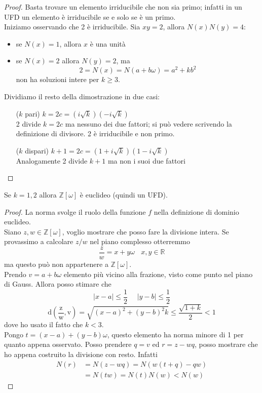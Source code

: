 \begin{proof}
	Basta trovare un elemento irriducibile che non sia primo; infatti in un UFD un elemento è irriducibile se e solo se è un primo. \\
	Iniziamo osservando che 2 è irriducibile. Sia $xy=2$, allora $N(x)N(y)=4$: 
	\begin{itemize}
		\item se $N(x)=1$, allora $x$ è una unità
		\item se $N(x)=2$ allora $N(y)=2$, ma 
		\begin{equation*}
		2=N(x)=N(a+b\omega)=a^2+kb^2
		\end{equation*}
		non ha soluzioni intere per $k\geq 3$.
	\end{itemize}
	Dividiamo il resto della dimostrazione in due casi:
	\begin{itemize}
		\item[($k$ pari)] $k=2c=(i\sqrt{k})(-i\sqrt{k})$\\ 2 divide $k=2c$ ma nessuno dei due fattori; si può vedere scrivendo la definizione di divisore. 2 è irriducibile e non primo.
		\item[($k$ dispari)] $k+1=2c=(1+i\sqrt{k})(1-i\sqrt{k})$\\ Analogamente 2 divide $k+1$ ma non i suoi due fattori
	\end{itemize}
\end{proof}
\begin{proposizione}
	Se $k=1,2$ allora $\mathbb{Z}[\omega]$ è euclideo (quindi un UFD).
\end{proposizione}
\begin{proof}
	La norma svolge il ruolo della funzione $f$ nella definizione di dominio euclideo.\\ Siano $z,w\in\mathbb{Z}[\omega]$, voglio mostrare che posso fare la divisione intera.
	Se provassimo a calcolare $z/w$ nel piano complesso otterremmo 
	\begin{equation*}
	\frac{z}{w}=x+y\omega \ \ \ \ x,y\in\mathbb{R}
	\end{equation*}
	ma questo può non appartenere a $\mathbb{Z}[\omega]$. \\ Prendo $v=a+b\omega$ elemento più vicino alla frazione, visto come punto nel piano di Gauss. Allora posso stimare che 
	\begin{equation*}
	|x-a|\leq\frac{1}{2} \ \ \ \ \ \ |y-b|\leq\frac{1}{2}
	\end{equation*}
	\begin{equation*}
	\operatorname{d\left(\frac{z}{w},v\right)}=\sqrt{(x-a)^2+(y-b)^2k}\leq\frac{\sqrt{1+k}}{2}<1
	\end{equation*}
	dove ho usato il fatto che $k<3$. \\ Pongo $t=(x-a)+(y-b)\omega$, questo elemento ha norma minore di 1 per quanto appena osservato. Posso prendere $q=v$ ed $r=z-wq$, posso mostrare che ho appena costruito la divisione con resto. Infatti
	\begin{align*}
	N(r)&=N(z-wq)=N\left(w(t+q)-qw\right)\\
	&=N(tw)=N(t)N(w)<N(w)
	\end{align*}
\end{proof}





